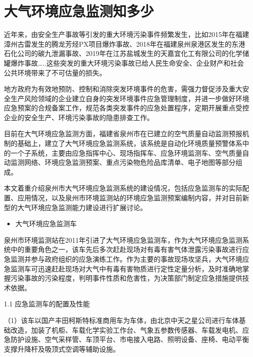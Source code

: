 \documentclass[]{book}
\providecommand{\tightlist}{%
  \setlength{\itemsep}{0pt}\setlength{\parskip}{0pt}}
\begin{document}
\hypertarget{ux5927ux6c14ux73afux5883ux5e94ux6025ux76d1ux6d4bux77e5ux591aux5c11}{%
\section{大气环境应急监测知多少}\label{ux5927ux6c14ux73afux5883ux5e94ux6025ux76d1ux6d4bux77e5ux591aux5c11}}

近年来，由安全生产事故等引发的重大环境污染事件频繁发生，比如2015年在福建漳州古雷发生的腾龙芳烃PX项目爆炸事故、2018年在福建泉州泉港区发生的东港石化公司的碳九泄漏事故、2019年在江苏盐城发生的天嘉宜化工有限公司的化学储罐爆炸事故\ldots{}..这些突发的重大环境污染事故已给人民生命安全、企业财产和社会公共环境带来了不可估量的损失。

地方政府为有效地预防、控制和消除突发环境事件的危害，需强力督促涉及重大安全生产风险领域的企业建立自身的突发环境事件应急管理制度，并进一步做好环境应急预案的合规备案工作，规范各类突发事件的应急处置程序，定期开展重点受控企业的安全生产、环境污染事故的隐患排查工作。

目前在大气环境应急监测方面，福建省泉州市在已建立的空气质量自动监测预报机制的基础上，建立了大气环境应急监测系统，该系统是自动化环境质量预警体系中的一个子系统，主要由应急指挥中心、现场指挥车、应急环境监测车、空气质量自动监测网络、环境应急监测预案、重点污染物危险品库清单、电子地图等部分组成。

本文着重介绍泉州市大气环境应急监测系统的建设情况，包括应急监测车的实际配置、应用情况，以及泉州市环境监测站的环境应急监测预案编制内容，并对目前新型的大气环境应急监测能力建设进行扩展讨论。

\begin{itemize}
\tightlist
\item
  大气环境应急监测车
\end{itemize}

泉州市环境监测站在2011年引进了大气环境应急监测车，作为大气环境应急监测系统中的重要角色之一，该车先后多次赶赴现场对有毒有害气体泄露污染事故进行应急监测并参与政府组织的应急演练工作。作为主要的事故现场攻坚兵，大气环境应急监测车可迅速赶赴现场对大气中有毒有害物质进行定性定量分析，及时准确地掌握污染事故的污染程度，判明事件性质和危害性，为决策部门制定应急措施提供技术依据。

1.1 应急监测车的配置及性能

（1）该车以国产丰田柯斯特标准商用车为车体，由北京中天之星公司进行车体基础改造，加装了机柜、车载化学实验工作台、气象五参数传感器、车载发电机、应急防护设施、空气采样管、车顶平台、市电接入电路、照明设备、座椅、电动平衡支撑升降杆及吸顶式空调等辅助设施。
\end{document}
